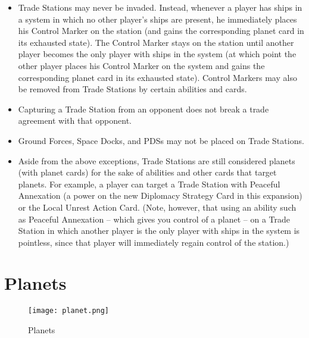 \documentclass[11pt,fleqn]{book} %
\begin{document}
\begin{SEbox}
\begin{itemize}
	\item Trade Stations may never be invaded.
	Instead, whenever a player has ships in a system in which no other player’s ships are present, he immediately places his Control Marker on the station (and gains the corresponding planet card in its exhausted state).
	The Control Marker stays on the station until another player becomes the only player with ships in the system (at which point the other player places his Control Marker on the system and gains the corresponding planet card in its exhausted state).
	Control Markers may also be removed from Trade Stations by certain abilities and cards.
	
	\item Capturing a Trade Station from an opponent does not break a trade agreement with that opponent.
	\item Ground Forces, Space Docks, and PDSs may not be placed on Trade Stations.
	\item Aside from the above exceptions, Trade Stations are still considered planets (with planet cards) for the sake of abilities and other cards that target planets.
	For example, a player can target a Trade Station with Peaceful Annexation (a power on the new Diplomacy Strategy Card in this expansion) or the Local Unrest Action Card. 
	(Note, however, that using an ability such as Peaceful Annexation – which gives you control of a planet – on a Trade Station in which another player is the only player with ships in the system is pointless, since that player will immediately regain control of the station.)
\end{itemize}


\end{SEbox}

\section{Planets}

\begin{figure}[h]
    \centering
    \texttt{[image: planet.png]}\\
    \caption{Planets}
    \label{fig:planets}
\end{figure}



\end{document}
